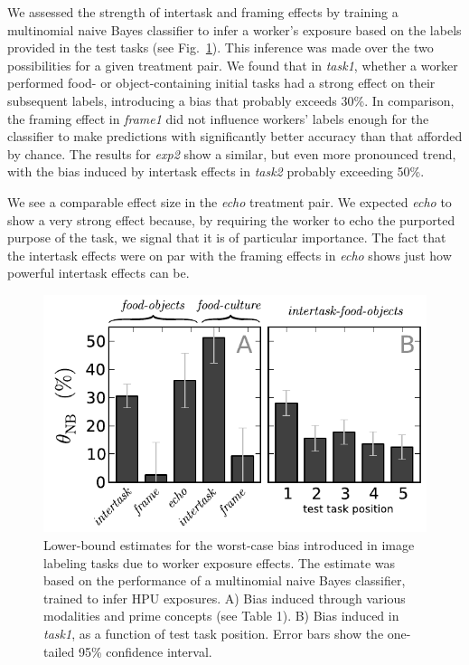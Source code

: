 \documentclass[12pt]{article}
\begin{document}
We assessed the strength of intertask and framing effects
by training a multinomial naive Bayes classifier to infer a worker's exposure
based on the labels provided in the test tasks (see Fig.~\ref{fig:theta}).
This inference was made over the two possibilities for a given treatment pair.
We found that in \textit{task1}, whether a worker performed food- or 
object-containing initial tasks had a strong effect on their subsequent 
labels, introducing a bias that probably exceeds 30\%.  In comparison, the 
framing effect in \textit{frame1} did 
not influence workers' labels enough for the classifier to make predictions 
with significantly better accuracy than that afforded by chance.  The results 
for \textit{exp2} show a similar, but even more pronounced trend, with the bias
induced by intertask effects in \textit{task2} probably exceeding 50\%.

We see a comparable effect size in the \textit{echo} treatment pair.
We expected \textit{echo} to show a very strong effect because, by requiring
the worker to echo the purported purpose of the task, we signal that it
is of particular importance.  The fact that the intertask effects were on par with the framing 
effects in \textit{echo} shows just how powerful intertask effects can be.

\begin{figure}
	\centering
	\includegraphics[scale=1]{figs/theta.pdf}
	\caption{
		Lower-bound estimates for the  worst-case bias introduced in image
		labeling tasks due to worker exposure effects.  The estimate was 
		based on the performance of a multinomial naive Bayes classifier,
		trained to infer HPU exposures. A) Bias induced through various
		modalities and prime concepts (see Table 1). B) Bias induced in 
		\textit{task1}, as a function of test task position.  Error bars
		show the one-tailed 95\% confidence interval.
	}
	\label{fig:theta}
\end{figure}
\end{document}
